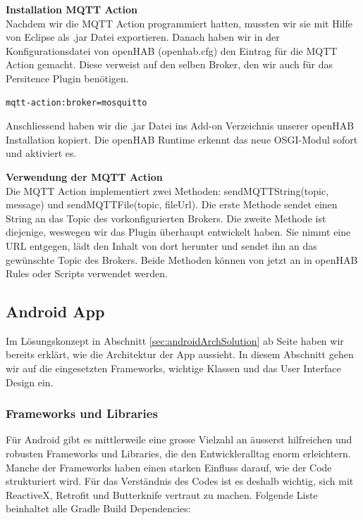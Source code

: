 \textbf{Installation MQTT Action}\\
Nachdem wir die MQTT Action programmiert hatten, mussten wir sie mit Hilfe von Eclipse als .jar Datei exportieren. Danach haben wir in der Konfigurationsdatei von openHAB (openhab.cfg) den Eintrag für die MQTT Action gemacht. Diese verweist auf den selben Broker, den wir auch für das Persitence Plugin benötigen.


\begin{lstlisting}[style=csharp, caption=openhab.cfg]
mqtt-action:broker=mosquitto
\end{lstlisting}

Anschliessend haben wir die .jar Datei ins Add-on Verzeichnis unserer openHAB Installation kopiert. Die openHAB Runtime erkennt das neue OSGI-Modul sofort und aktiviert es.

\textbf{Verwendung der MQTT Action}\\
Die MQTT Action implementiert zwei Methoden: sendMQTTString(topic, message) und sendMQTTFile(topic, fileUrl). Die erste Methode sendet einen String an das Topic des vorkonfigurierten Brokers. Die zweite Methode ist diejenige, weswegen wir das Plugin überhaupt entwickelt haben. Sie nimmt eine URL entgegen, lädt den Inhalt von dort herunter und sendet ihn an das gewünschte Topic des Brokers. Beide Methoden können von jetzt an in openHAB Rules oder Scripts verwendet werden.

\subsection{Android App}
Im Lösungskonzept in Abschnitt \ref{sec:androidArchSolution} ab Seite \pageref{sec:androidArchSolution} haben wir bereits erklärt, wie die Architektur der App aussieht. In diesem Abschnitt gehen wir auf die eingesetzten Frameworks, wichtige Klassen und das User Interface Design ein.

\subsubsection{Frameworks und Libraries}
Für Android gibt es mittlerweile eine grosse Vielzahl an äusserst hilfreichen und robusten Frameworks und Libraries, die den Entwickleralltag enorm erleichtern. Manche der Frameworks haben einen starken Einfluss darauf, wie der Code strukturiert wird. Für das Verständnis des Codes ist es deshalb wichtig, sich mit ReactiveX, Retrofit und Butterknife vertraut zu machen. Folgende Liste beinhaltet alle Gradle Build Dependencies:

